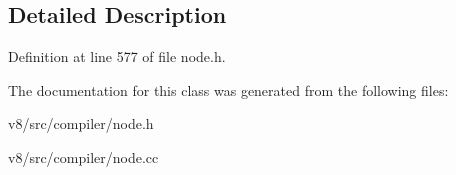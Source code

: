 \subsection{Detailed Description}


Definition at line 577 of file node.\+h.



The documentation for this class was generated from the following files\+:\begin{DoxyCompactItemize}
\item 
v8/src/compiler/node.\+h\item 
v8/src/compiler/node.\+cc\end{DoxyCompactItemize}
